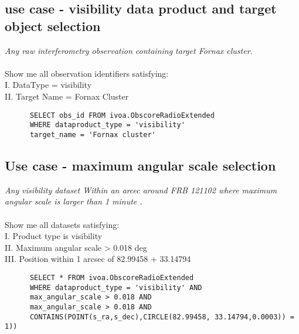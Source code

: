 
\subsection{ use case - visibility data product and target object selection }
\textit{Any raw interferometry observation containing target Fornax cluster.}\\
\\
Show me all  observation identifiers satisfying:\\
I. DataType = visibility \\
II. Target Name = Fornax Cluster \\
\begin{verbatim}
      SELECT obs_id FROM ivoa.ObscoreRadioExtended
      WHERE dataproduct_type = 'visibility'
      target_name = 'Fornax cluster'
\end{verbatim}





\subsection{Use case - maximum angular scale selection}
\textit{Any visibility dataset Within an arcec around FRB 121102  where  maximum angular scale is larger than 1 minute .}\\ \\
Show me all datasets satisfying:\\
I. Product type is visibility \\
II. Maximum angular scale  >  0.018 deg \\
III. Position within 1 arcsec of 82.99458 + 33.14794
\begin{verbatim}
      SELECT * FROM ivoa.ObscoreRadioExtended
      WHERE dataproduct_type = 'visibility' AND
      max_angular_scale > 0.018 AND
      max_angular_scale > 0.018 AND
      CONTAINS(POINT(s_ra,s_dec),CIRCLE(82.99458, 33.14794,0.0003)) = 1))
\end{verbatim}

